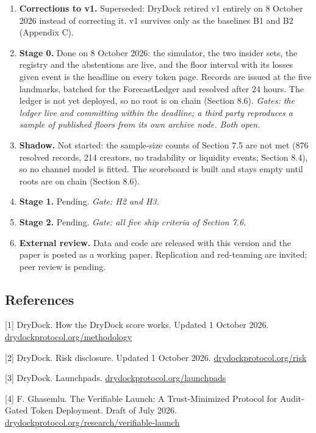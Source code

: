 \begin{enumerate}
\def\labelenumi{\arabic{enumi}.}
\tightlist
\item
  \textbf{Corrections to v1.} Superseded: DryDock retired v1 entirely on 8 October 2026 instead of correcting it. v1 survives only as the baselines B1 and B2 (Appendix C).
\item
  \textbf{Stage 0.} Done on 8 October 2026: the simulator, the two insider sets, the registry and the abstentions are live, and the floor interval with its losses given event is the headline on every token page. Records are issued at the five landmarks, batched for the ForecastLedger and resolved after 24 hours. The ledger is not yet deployed, so no root is on chain (Section 8.6). \emph{Gates: the ledger live and committing within the deadline; a third party reproduces a sample of published floors from its own archive node. Both open.}
\item
  \textbf{Shadow.} Not started: the sample-size counts of Section 7.5 are not met (876 resolved records, 214 creators, no tradability or liquidity events; Section 8.4), so no channel model is fitted. The scoreboard is built and stays empty until roots are on chain (Section 8.6).
\item
  \textbf{Stage 1.} Pending. \emph{Gate: H2 and H3.}
\item
  \textbf{Stage 2.} Pending. \emph{Gate: all five ship criteria of Section 7.6.}
\item
  \textbf{External review.} Data and code are released with this version and the paper is posted as a working paper. Replication and red-teaming are invited; peer review is pending.
\end{enumerate}

\subsection{References}\label{references}

{[}1{]} DryDock. How the DryDock score works. Updated 1 October 2026. \href{https://drydockprotocol.org/methodology}{drydockprotocol.org/methodology}

{[}2{]} DryDock. Risk disclosure. Updated 1 October 2026. \href{https://drydockprotocol.org/risk}{drydockprotocol.org/risk}

{[}3{]} DryDock. Launchpads. \href{https://drydockprotocol.org/launchpads}{drydockprotocol.org/launchpads}

{[}4{]} F. Ghasemlu. The Verifiable Launch: A Trust-Minimized Protocol for Audit-Gated Token Deployment. Draft of July 2026. \href{https://drydockprotocol.org/research/verifiable-launch}{drydockprotocol.org/research/verifiable-launch}

